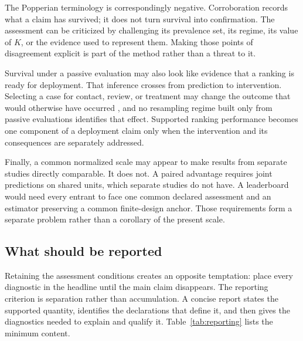 \documentclass[11pt]{article}
\theoremstyle{remark}
\begin{document}
The Popperian terminology is correspondingly negative. Corroboration records what a claim has survived; it does not turn survival into confirmation. The assessment can be criticized by challenging its prevalence set, its regime, its value of $K$, or the evidence used to represent them. Making those points of disagreement explicit is part of the method rather than a threat to it.

Survival under a passive evaluation may also look like evidence that a ranking is ready for deployment. That inference crosses from prediction to intervention. Selecting a case for contact, review, or treatment may change the outcome that would otherwise have occurred \cite{perdomo2020performative}, and no resampling regime built only from passive evaluations identifies that effect. Supported ranking performance becomes one component of a deployment claim only when the intervention and its consequences are separately addressed.

Finally, a common normalized scale may appear to make results from separate studies directly comparable. It does not. A paired advantage requires joint predictions on shared units, which separate studies do not have. A leaderboard would need every entrant to face one common declared assessment and an estimator preserving a common finite-design anchor. Those requirements form a separate problem rather than a corollary of the present scale.

\subsection{What should be reported}

Retaining the assessment conditions creates an opposite temptation: place every diagnostic in the headline until the main claim disappears. The reporting criterion is separation rather than accumulation. A concise report states the supported quantity, identifies the declarations that define it, and then gives the diagnostics needed to explain and qualify it. Table~\ref{tab:reporting} lists the minimum content.
\end{document}
